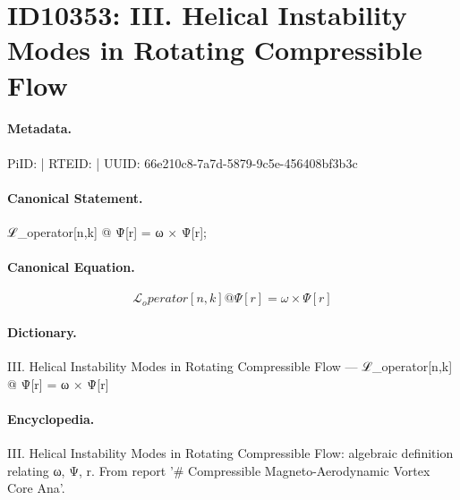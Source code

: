 \section*{ID10353: III. Helical Instability Modes in Rotating Compressible Flow}
\paragraph{Metadata.}
PiID:  | RTEID:  | UUID: 66e210c8-7a7d-5879-9c5e-456408bf3b3c

\paragraph{Canonical Statement.}
ℒ\_operator[n,k] @ Ψ̂[r] = ω × Ψ̂[r];

\paragraph{Canonical Equation.}
\[
ℒ_operator[n,k] @ Ψ̂[r] = ω × Ψ̂[r]
\]

\paragraph{Dictionary.}
III. Helical Instability Modes in Rotating Compressible Flow — ℒ\_operator[n,k] @ Ψ̂[r] = ω × Ψ̂[r]

\paragraph{Encyclopedia.}
III. Helical Instability Modes in Rotating Compressible Flow: algebraic definition relating ω, Ψ, r. From report '\# Compressible Magneto-Aerodynamic Vortex Core Ana'.
